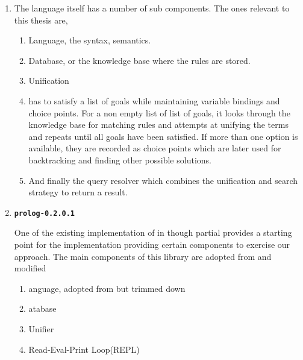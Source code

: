 \documentclass[thesis-solanki.tex]{subfiles}
\providecommand\codeLibrary[1]{\texttt{\bfseries #1}}
\begin{document}
\begin{enumerate}
\item {}

The language itself has a number of sub components.
The ones relevant to this thesis are,
\begin{enumerate}
\item Language, the syntax, semantics.

\item Database, or the knowledge base where the rules are stored.

\item Unification

\item
   has to satisfy a list of goals while maintaining variable bindings and choice points.
  For a non empty list of list of goals, it looks through the knowledge base for matching rules and attempts at
  unifying the terms and repeats until all goals have been satisfied.
  If more than one option is available, they are recorded as choice points which are later used for backtracking
  and finding other possible solutions.

\item
  And finally the query resolver which combines the unification and search strategy to return a result.
\end{enumerate}

\item \codeLibrary{prolog-0.2.0.1} \cite{prolog-lib}

  One of the existing implementation of  in  though partial provides a starting
  point for the implementation providing certain components to exercise our approach.
  The main components of this library are adopted from  and modified\yyy{,}{:}

\begin{enumerate}
\item {} anguage, adopted from  but trimmed down

\item {}atabase\yyy{}{;}

\item Unifier

\item Read-Eval-Print Loop(REPL)


\end{enumerate}
\end{enumerate}
\end{document}
